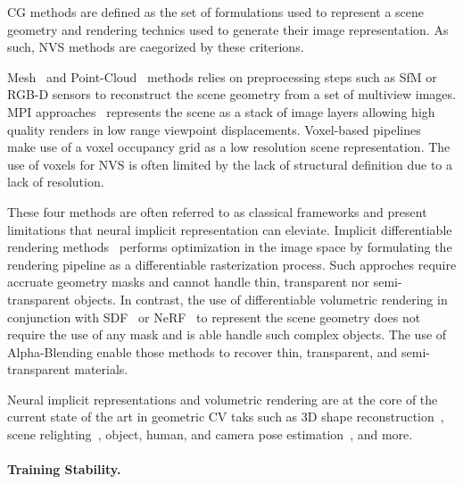 \documentclass[runningheads]{llncs}
\begin{document}
\gls{CG} methods are defined as the set of formulations used to represent a scene geometry and rendering technics used to generate their image representation. As such, \gls{NVS} methods are caegorized by these criterions.

Mesh~\cite{Buehler2001,Debevec1996,Waechter2014,Wood2000} and Point-Cloud~\cite{Aliev2020,Riegler2020,Schonberger2016,Song2020} methods relies on preprocessing steps such as \gls{SfM} or RGB-D sensors to reconstruct the scene geometry from a set of multiview images. \gls{MPI} approaches~\cite{Flynn2019,Mildenhall2019,Srinivasan2020,Zhou2018} represents the scene as a stack of image layers allowing high quality renders in low range viewpoint displacements. Voxel-based pipelines~\cite{Kutulakos1999,Lombardi2019,Penner2017,Seitz1997,Sitzmann2019,Szeliski1998} make use of a voxel occupancy grid as a low resolution scene representation. The use of voxels for \gls{NVS} is often limited by the lack of structural definition due to a lack of resolution.

These four methods are often referred to as classical frameworks and present limitations that neural implicit representation can eleviate. Implicit differentiable rendering methods~\cite{Liu2019,Mildenhall2020,Niemeyer2020,Park2019,Park2020,Yariv2020} performs optimization in the image space by formulating the rendering pipeline as a differentiable rasterization process. Such approches require accruate geometry masks and cannot handle thin, transparent nor semi-transparent objects. In contrast, the use of differentiable volumetric rendering in conjunction with \gls{SDF}~\cite{Chibane2020,Liu2020b,Park2019} or \gls{NeRF}~\cite{Mildenhall2020} to represent the scene geometry does not require the use of any mask and is able handle such complex objects. The use of Alpha-Blending enable those methods to recover thin, transparent, and semi-transparent materials.

Neural implicit representations and volumetric rendering are at the core of the current state of the art in geometric \gls{CV} taks such as 3D shape reconstruction~\cite{Jain2021,Jang2021,Saito2019}, scene relighting~\cite{Boss2021,Rudnev2021,Srinivasan2021,Zhang2021b}, object, human, and camera pose estimation~\cite{Guo2021,Su2021,Yen2020}, and more.

\paragraph{\textbf{Training Stability.}}
\end{document}

